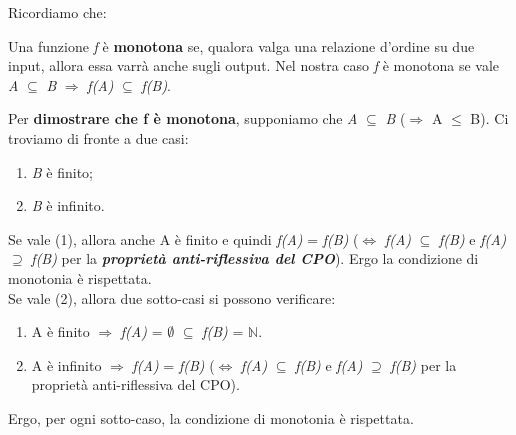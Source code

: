 {
	Ricordiamo che:
	\begin{mydef}
	Una funzione \textit{f} è \textbf{monotona} se, qualora valga una relazione d'ordine su due input, allora essa varrà anche sugli output. Nel nostra caso \textit{f} è monotona se vale \textit{A} $\subseteq$ \textit{B} $\Rightarrow$ \textit{f(A)} $\subseteq$ \textit{f(B)}.
	\end{mydef}

	Per \textbf{dimostrare che f è monotona}, supponiamo che \textit{A} $\subseteq$ \textit{B} ($\Rightarrow$ \textbar A\textbar{} $\leq$ \textbar B\textbar{}). Ci troviamo di fronte a due casi:
	\begin{enumerate}
		\item \textit{B} è finito;
		\item \textit{B} è infinito.
	\end{enumerate}
	
	Se vale (1), allora anche 
	\textbar A\textbar{} è finito e quindi \textit{f(A)} = \textit{f(B)} ($\iff$ \textit{f(A)} $\subseteq$ \textit{f(B)} e \textit{f(A)} $\supseteq$ \textit{f(B)} per la \textit{\textbf{proprietà anti-riflessiva del CPO}}). Ergo la condizione di monotonia è rispettata.\\
	
	Se vale (2), allora due sotto-casi si possono verificare:
	\begin{enumerate}
		\item A è finito $\Rightarrow$ \textit{f(A)} = $\emptyset$ $\subseteq$ \textit{ f(B)} = $\mathbb{N}$.
		\item A è infinito $\Rightarrow$ \textit{f(A)} = \textit{f(B)} ($\iff$ \textit{f(A)} $\subseteq$ \textit{f(B)} e \textit{f(A)} $\supseteq$ \textit{f(B)} per la proprietà anti-riflessiva del CPO).
	\end{enumerate}
	
	Ergo, per ogni sotto-caso, la condizione di monotonia è rispettata.\\


}
